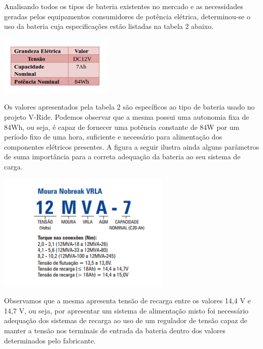 Analisando todos os tipos de bateria existentes no mercado e as necessidades geradas pelos equipamentos consumidores de potência elétrica, determinou-se o uso da bateria cuja especificações estão listadas na tabela 2 abaixo.

 \begin{center}
    	\includegraphics[scale=0.7]{figuras/tabela}
        \label{tabela}
    \end{center}
Os valores apresentados pela tabela 2 são específicos ao tipo de bateria usado no projeto V-Ride. Podemos observar que a mesma possui uma autonomia fixa de 84Wh, ou seja, é capaz de fornecer uma potência constante de 84W por um período fixo de uma hora, suficiente e necessário para alimentação dos componentes elétricos presentes.
A figura a seguir ilustra ainda alguns parâmetros de suma importância para a correta adequação da bateria ao seu sistema de carga. 
                                           
                            
 \begin{center}
    	\includegraphics[scale=0.7]{figuras/esp}
        \label{esp}
    \end{center}
Observamos que a mesma apresenta tensão de recarga entre os valores 14,4 V e 14,7 V, ou seja, por apresentar um sistema de alimentação misto foi necessário adequação dos sistemas de recarga ao uso de um regulador de tensão capaz de manter a tensão nos terminais de entrada da bateria dentro dos valores determinados pelo fabricante. 

